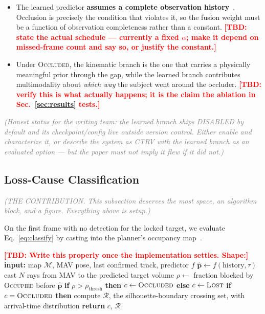 \documentclass[conference]{IEEEtran}
\newcommand{\tbd}[1]{\textcolor{red}{\textbf{[TBD: #1]}}}
\newcommand{\note}[1]{\textcolor{gray}{\textit{(#1)}}}
\newcommand{\occluded}{\textsc{Occluded}}
\newcommand{\lost}{\textsc{Lost}}
\begin{document}
\begin{itemize}
  \item The learned predictor \textbf{assumes a complete observation
        history}~\cite{chib2024trajimpute}. Occlusion is precisely the condition
        that violates it, so the fusion weight must be a function of observation
        completeness rather than a constant. \tbd{state the actual schedule ---
        currently a fixed $\alpha$; make it depend on missed-frame count and say
        so, or justify the constant.}
  \item Under \occluded{}, the kinematic branch is the one that carries a
        physically meaningful prior through the gap, while the learned branch
        contributes multimodality about \emph{which way} the subject went around
        the occluder. \tbd{verify this is what actually happens; it is the
        claim the ablation in Sec.~\ref{sec:results} tests.}
\end{itemize}

\note{Honest status for the writing team: the learned branch ships DISABLED by
default and its checkpoint/config live outside version control. Either enable and
characterize it, or describe the system as CTRV with the learned branch as an
evaluated option --- but the paper must not imply it flew if it did not.}

\subsection{Loss-Cause Classification}
\label{sec:classify}
\note{THE CONTRIBUTION. This subsection deserves the most space, an algorithm
block, and a figure. Everything above is setup.}

On the first frame with no detection for the locked target, we evaluate
Eq.~\eqref{eq:classify} by casting into the planner's occupancy
map~\cite{ren2023rogmap}.

\begin{algorithm}[t]
\caption{\tbd{Loss classification and reappearance belief}}
\label{alg:classify}
\begin{algorithmic}[1]
\STATE \tbd{Write this properly once the implementation settles. Shape:}
\STATE \textbf{input:} map $\mathcal{M}$, MAV pose, last confirmed track, predictor $f$
\STATE $\hat{\mathbf{p}} \leftarrow f(\text{history}, \tau)$
\STATE cast $N$ rays from MAV to the predicted target volume
\STATE $\rho \leftarrow$ fraction blocked by \textsc{Occupied} before $\hat{\mathbf{p}}$
\STATE \textbf{if} $\rho > \rho_{\text{thresh}}$ \textbf{then} $c \leftarrow \occluded{}$
       \textbf{else} $c \leftarrow \lost{}$
\STATE \textbf{if} $c = \occluded{}$ \textbf{then} compute $\mathcal{R}$, the
       silhouette-boundary crossing set, with arrival-time distribution
\STATE \textbf{return} $c$, $\mathcal{R}$
\end{algorithmic}
\end{algorithm}
\end{document}
